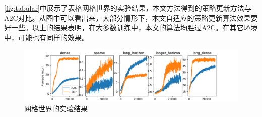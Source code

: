 \autoref{fig:tabular}中展示了表格网格世界的实验结果，本文方法得到的策略更新方法与A2C对比。从图中可以看出来，大部分情形下，本文自适应的策略更新算法效果要好一些。以上的结果表明，在大多数训练中，本文的算法均胜过A2C。在其它环境中，可能也有同样的效果。

\begin{figure}[h!]
    \centering
    \includegraphics[width=1\textwidth]{image/chap04/tabular.png}
    \caption{网格世界的实验结果}
    \label{fig:tabular}
\end{figure}
